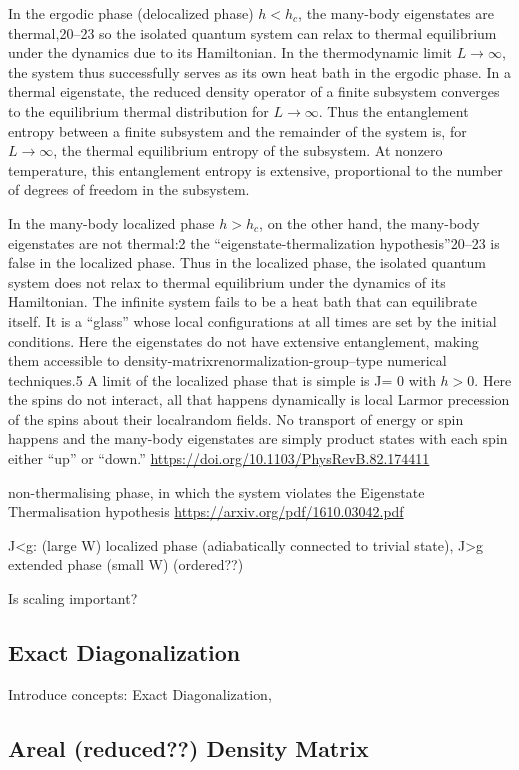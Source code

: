 \documentclass[reprint,amsmath,amssymb,aps,prb]{revtex4-2}
\begin{document}
In the ergodic phase (delocalized phase) $h<h_c$, the many-body eigenstates
are thermal,20–23 so the isolated quantum system can relax to
thermal equilibrium under the dynamics due to its Hamiltonian.
In the thermodynamic limit $L\rightarrow\infty$, the system thus
successfully serves as its own heat bath in the ergodic phase.
In a thermal eigenstate, the reduced density operator of a
finite subsystem converges to the equilibrium thermal distribution
for $L\rightarrow\infty$. Thus the entanglement entropy between a
finite subsystem and the remainder of the system is, for  $L\rightarrow\infty$, the thermal equilibrium entropy of the subsystem. At
nonzero temperature, this entanglement entropy is extensive,
proportional to the number of degrees of freedom in the subsystem.


In the many-body localized phase $h>h_c$, on the other
hand, the many-body eigenstates are not thermal:2 the
“eigenstate-thermalization hypothesis”20–23 is false in the
localized phase. Thus in the localized phase, the isolated
quantum system does not relax to thermal equilibrium
under the dynamics of its Hamiltonian. The infinite system
fails to be a heat bath that can equilibrate itself. It is a
“glass” whose local configurations at all times are set by the
initial conditions. Here the eigenstates do not have extensive
entanglement, making them accessible to density-matrixrenormalization-group–type
numerical techniques.5 A limit
of the localized phase that is simple is J= 0 with $h>0$. Here
the spins do not interact, all that happens dynamically is
local Larmor precession of the spins about their localrandom
fields. No transport of energy or spin happens and
the many-body eigenstates are simply product states with
each spin either “up” or “down.”
\url{https://doi.org/10.1103/PhysRevB.82.174411}


non-thermalising phase, in which the system violates the Eigenstate Thermalisation hypothesis
\url{https://arxiv.org/pdf/1610.03042.pdf}


J<g: (large W) localized phase (adiabatically connected to trivial state), J>g extended phase (small W) (ordered??)

Is scaling important?

\subsection{Exact Diagonalization}

Introduce concepts: Exact Diagonalization, 

\subsection{Areal (reduced??) Density Matrix}
\end{document}
